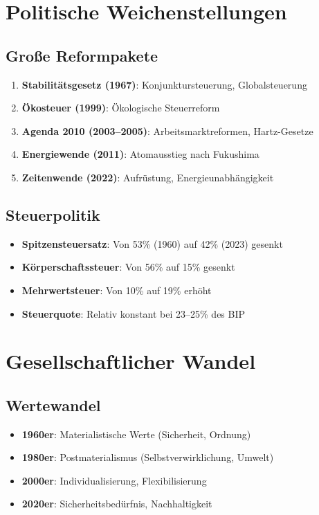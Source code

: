 \section{Politische Weichenstellungen}

\subsection{Große Reformpakete}
\begin{enumerate}
\item \textbf{Stabilitätsgesetz (1967)}: Konjunktursteuerung, Globalsteuerung
\item \textbf{Ökosteuer (1999)}: Ökologische Steuerreform
\item \textbf{Agenda 2010 (2003--2005)}: Arbeitsmarktreformen, Hartz-Gesetze
\item \textbf{Energiewende (2011)}: Atomausstieg nach Fukushima
\item \textbf{Zeitenwende (2022)}: Aufrüstung, Energieunabhängigkeit
\end{enumerate}

\subsection{Steuerpolitik}
\begin{itemize}
\item \textbf{Spitzensteuersatz}: Von 53\% (1960) auf 42\% (2023) gesenkt
\item \textbf{Körperschaftssteuer}: Von 56\% auf 15\% gesenkt
\item \textbf{Mehrwertsteuer}: Von 10\% auf 19\% erhöht
\item \textbf{Steuerquote}: Relativ konstant bei 23--25\% des BIP
\end{itemize}

\section{Gesellschaftlicher Wandel}

\subsection{Wertewandel}
\begin{itemize}
\item \textbf{1960er}: Materialistische Werte (Sicherheit, Ordnung)
\item \textbf{1980er}: Postmaterialismus (Selbstverwirklichung, Umwelt)
\item \textbf{2000er}: Individualisierung, Flexibilisierung
\item \textbf{2020er}: Sicherheitsbedürfnis, Nachhaltigkeit
\end{itemize}

